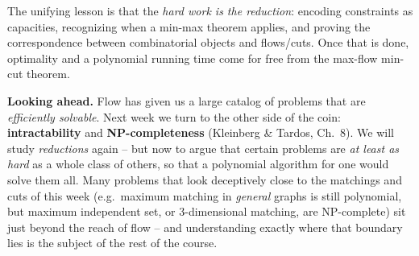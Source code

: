 \documentclass[11pt]{article}
\begin{document}
The unifying lesson is that the \emph{hard work is the reduction}: encoding
constraints as capacities, recognizing when a min-max theorem applies, and
proving the correspondence between combinatorial objects and flows/cuts. Once
that is done, optimality and a polynomial running time come for free from the
max-flow min-cut theorem.

\textbf{Looking ahead.} Flow has given us a large catalog of problems that are
\emph{efficiently solvable}. Next week we turn to the other side of the coin:
\textbf{intractability} and \textbf{NP-completeness} (Kleinberg \& Tardos, Ch.\
8). We will study \emph{reductions} again -- but now to argue that certain
problems are \emph{at least as hard} as a whole class of others, so that a
polynomial algorithm for one would solve them all. Many problems that look
deceptively close to the matchings and cuts of this week (e.g.\ maximum matching
in \emph{general} graphs is still polynomial, but maximum independent set, or
3-dimensional matching, are NP-complete) sit just beyond the reach of flow --
and understanding exactly where that boundary lies is the subject of the rest of
the course.
\end{document}

